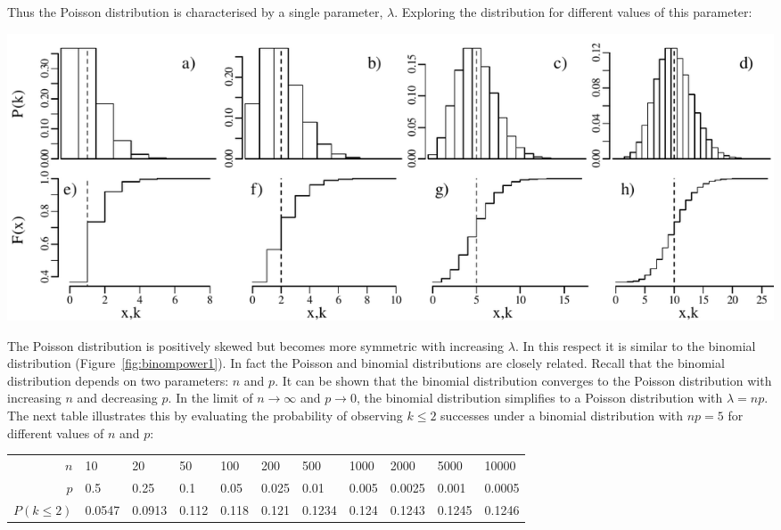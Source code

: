 Thus the Poisson distribution is characterised by a single parameter,
$\lambda$. Exploring the distribution for different values of this
parameter:\medskip

\noindent\includegraphics[width=\textwidth]{../figures/increasinglambda.pdf}
\begingroup {} \endgroup

The Poisson distribution is positively skewed but becomes more
symmetric with increasing $\lambda$. In this respect it is similar to
the binomial distribution (Figure~\ref{fig:binompower1}). In fact the
Poisson and binomial distributions are closely related. Recall that
the binomial distribution depends on two parameters: $n$ and $p$. It
can be shown that the binomial distribution converges to the Poisson
distribution with increasing $n$ and decreasing $p$. In the limit of
$n \rightarrow \infty$ and $p \rightarrow 0$, the binomial
distribution simplifies to a Poisson distribution with $\lambda =
{n}{p}$. The next table illustrates this by evaluating the probability
of observing $k\leq{2}$ successes under a binomial distribution with
$np=5$ for different values of $n$ and $p$:

\begin{center}
\begin{tabular}{r|llllllllll}
$n$ & 10 & 20 & 50 & 100 & 200 & 500 & 1000 & 2000 & 5000 & 10000 \\
$p$ & 0.5 & 0.25 & 0.1 & 0.05 & 0.025 & 0.01 & 0.005 & 0.0025 & 0.001 & 0.0005 \\
$P(k\leq{2})$ & 0.0547 & 0.0913 & 0.112 & 0.118 & 0.121 & 0.1234 & 0.124 & 0.1243 & 0.1245 & 0.1246
\end{tabular}
\end{center}


